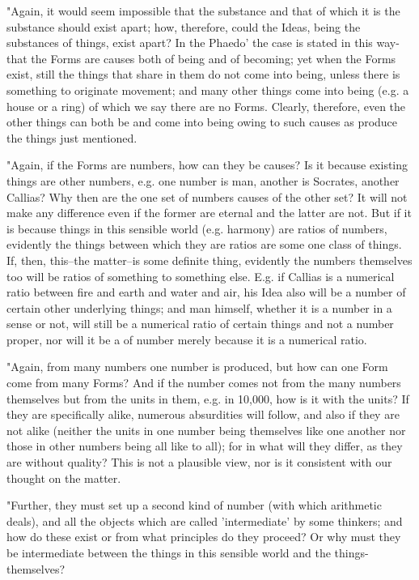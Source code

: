 "Again, it would seem impossible that the substance and that of which
it is the substance should exist apart; how, therefore, could the
Ideas, being the substances of things, exist apart? In the Phaedo'
the case is stated in this way-that the Forms are causes both of being
and of becoming; yet when the Forms exist, still the things that share
in them do not come into being, unless there is something to originate
movement; and many other things come into being (e.g. a house or a
ring) of which we say there are no Forms. Clearly, therefore, even
the other things can both be and come into being owing to such causes
as produce the things just mentioned. 

"Again, if the Forms are numbers, how can they be causes? Is it because
existing things are other numbers, e.g. one number is man, another
is Socrates, another Callias? Why then are the one set of numbers
causes of the other set? It will not make any difference even if the
former are eternal and the latter are not. But if it is because things
in this sensible world (e.g. harmony) are ratios of numbers, evidently
the things between which they are ratios are some one class of things.
If, then, this--the matter--is some definite thing, evidently the
numbers themselves too will be ratios of something to something else.
E.g. if Callias is a numerical ratio between fire and earth and water
and air, his Idea also will be a number of certain other underlying
things; and man himself, whether it is a number in a sense or not,
will still be a numerical ratio of certain things and not a number
proper, nor will it be a of number merely because it is a numerical
ratio. 

"Again, from many numbers one number is produced, but how can one
Form come from many Forms? And if the number comes not from the many
numbers themselves but from the units in them, e.g. in 10,000, how
is it with the units? If they are specifically alike, numerous absurdities
will follow, and also if they are not alike (neither the units in
one number being themselves like one another nor those in other numbers
being all like to all); for in what will they differ, as they are
without quality? This is not a plausible view, nor is it consistent
with our thought on the matter. 

"Further, they must set up a second kind of number (with which arithmetic
deals), and all the objects which are called 'intermediate' by some
thinkers; and how do these exist or from what principles do they proceed?
Or why must they be intermediate between the things in this sensible
world and the things-themselves? 

